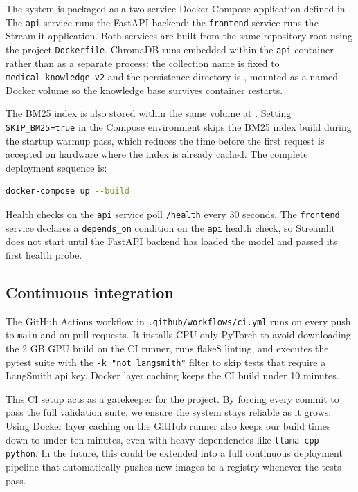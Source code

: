 The system is packaged as a two-service Docker Compose application defined in . The \texttt{api} service runs the FastAPI backend; the \texttt{frontend} service runs the Streamlit application. Both services are built from the same repository root using the project \texttt{Dockerfile}. ChromaDB runs embedded within the \texttt{api} container rather than as a separate process: the collection name is fixed to \texttt{medical\_knowledge\_v2} and the persistence directory is , mounted as a named Docker volume so the knowledge base survives container restarts.

The BM25 index is also stored within the same volume at . Setting \texttt{SKIP\_BM25=true} in the Compose environment skips the BM25 index build during the startup warmup pass, which reduces the time before the first request is accepted on hardware where the index is already cached. The complete deployment sequence is:

\begin{lstlisting}[language=bash, caption=Docker Compose deployment]
docker-compose up --build
\end{lstlisting}

Health checks on the \texttt{api} service poll \texttt{/health} every 30 seconds. The \texttt{frontend} service declares a \texttt{depends\_on} condition on the \texttt{api} health check, so Streamlit does not start until the FastAPI backend has loaded the model and passed its first health probe.

\subsection{Continuous integration}

The GitHub Actions workflow in \texttt{.github/workflows/ci.yml} runs on every push to \texttt{main} and on pull requests. It installs CPU-only PyTorch to avoid downloading the 2 GB GPU build on the CI runner, runs flake8 linting, and executes the pytest suite with the \texttt{-k "not langsmith"} filter to skip tests that require a LangSmith \ac{api} key. Docker layer caching keeps the CI build under 10 minutes.

This CI setup acts as a gatekeeper for the project. By forcing every commit to pass the full validation suite, we ensure the system stays reliable as it grows. Using Docker layer caching on the GitHub runner also keeps our build times down to under ten minutes, even with heavy dependencies like \texttt{llama-cpp-python}. In the future, this could be extended into a full continuous deployment pipeline that automatically pushes new images to a registry whenever the tests pass.

